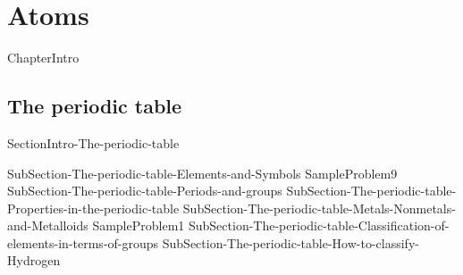 \documentclass[main.tex]{subfiles}
\newcommand\chapterlabel{Ch-Table}\setcounter{figurenewcounter}{0}\setcounter{tablenewcounter}{0}\setcounter{formulanewcounter}{0}\chapterpicture{../{\chapterlabel}/figure1}\chapterpicturelabel{PxFuel}
\begin{document}
 \setcounter{chapter}{2}\chapter[Atoms]{Atoms} %

 
 
   
 {ChapterIntro}

\section{The periodic table}{SectionIntro-The-periodic-table}
\sloppy\begin{description}
{SubSection-The-periodic-table-Elements-and-Symbols}
{SampleProblem9}
{SubSection-The-periodic-table-Periods-and-groups}
{SubSection-The-periodic-table-Properties-in-the-periodic-table}
{SubSection-The-periodic-table-Metals-Nonmetals-and-Metalloids}
{SampleProblem1}
{SubSection-The-periodic-table-Classification-of-elements-in-terms-of-groups}
{SubSection-The-periodic-table-How-to-classify-Hydrogen}
 \hspace{0cm}{Figure-The-periodic-table}
 \end{description}
 
\end{document}
